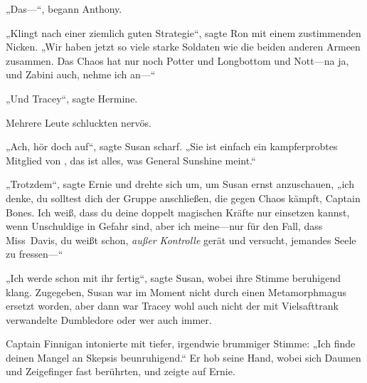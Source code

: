 „Das—“, begann Anthony.

„Klingt nach einer ziemlich guten Strategie“, sagte Ron mit einem zustimmenden Nicken. „Wir haben jetzt so viele starke Soldaten wie die beiden anderen Armeen zusammen. Das Chaos hat nur noch Potter und Longbottom und Nott—na ja, und Zabini auch, nehme ich an—“

„Und Tracey“, sagte Hermine.

Mehrere Leute schluckten nervös.

„Ach, hör doch auf“, sagte Susan scharf. „Sie ist einfach ein kampferprobtes Mitglied von \SPHEW, das ist alles, was General Sunshine meint.“

„Trotzdem“, sagte Ernie und drehte sich um, um Susan ernst anzuschauen, „ich denke, du solltest dich der Gruppe anschließen, die gegen Chaos kämpft, Captain Bones. Ich weiß, dass du deine doppelt magischen Kräfte nur einsetzen kannst, wenn Unschuldige in Gefahr sind, aber ich meine—nur für den Fall, dass Miss~Davis, du weißt schon, \emph{außer Kontrolle} gerät und versucht, jemandes Seele zu fressen—“

„Ich werde schon mit ihr fertig“, sagte Susan, wobei ihre Stimme beruhigend klang. Zugegeben, Susan war im Moment nicht durch einen Metamorphmagus ersetzt worden, aber dann war Tracey wohl auch nicht der mit Vielsafttrank verwandelte Dumbledore oder wer auch immer.

Captain Finnigan intonierte mit tiefer, irgendwie brummiger Stimme: „Ich finde deinen Mangel an Skepsis beunruhigend.“ Er hob seine Hand, wobei sich Daumen und Zeigefinger fast berührten, und zeigte auf Ernie.

